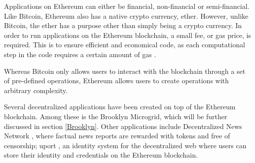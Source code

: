 Applications on Ethereum can either be financial, non-financial or semi-financial. Like Bitcoin, Ethereum also has a native crypto currency, ether. However, unlike Bitcoin, the ether has a purpose other than simply being a crypto currency. In order to run applications on the Ethereum blockchain, a small fee, or gas price, is required. This is to ensure efficient and economical code, as each computational step in the code requires a certain amount of gas \cite{ether_white_paper}.

Whereas Bitcoin only allows users to interact with the blockchain through a set of pre-defined operations, Ethereum allows users to create operations with arbitrary complexity.

Several decentralized applications have been created on top of the Ethereum blockchain. Among these is the Brooklyn Microgrid, which will be further discussed in section \ref{Brooklyn}. Other applications include Decentralized News Network \cite{DNN}, where factual news reports are rewarded with tokens and free of censorship; uport \cite{uport}, an identity system for the decentralized web where users can store their identity and credentials on the Ethereum blockchain.




